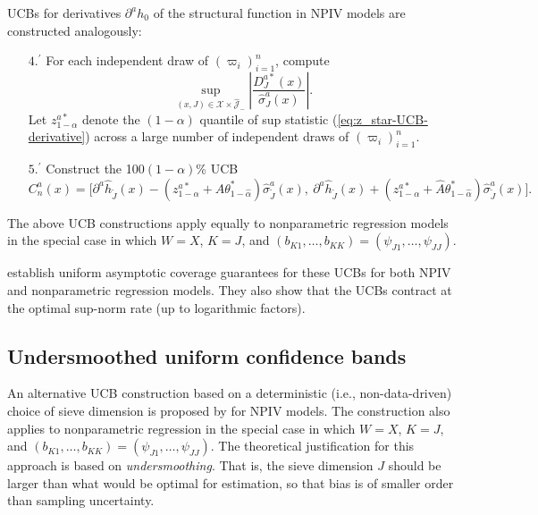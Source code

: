 \documentclass[
]{jss}
\begin{document}
UCBs for derivatives \(\partial^a h_0\) of the structural function in
NPIV models are constructed analogously:

\begin{enumerate}
\item[$4.^{\prime}$] For each independent draw of $(\varpi_i)_{i=1}^n$, compute
\begin{equation} \label{eq:z_star-UCB-derivative}
 \sup_{(x,J) \in \mathcal{X} \times \hat{\mathcal J}_{-}} \left| \frac{D_J^{a*}(x)}{\hat \sigma_J^a(x)} \right|.
\end{equation}
Let $z_{1-\alpha}^{a*}$ denote the $(1-\alpha )$ quantile of sup statistic (\ref{eq:z_star-UCB-derivative}) across a large number of independent draws of $(\varpi_i)_{i=1}^n$.
\item[$5.^{\prime}$] Construct the 100$(1-\alpha)$\% UCB
\begin{equation} \label{band-derivative}
 C_n^a(x) = \bigg[ \partial^a \hat{h}_{\tilde{J}}(x) - \left(\! z_{1-\alpha}^{a*} + \hat A \theta^*_{1-\hat \alpha} \! \right) \hat \sigma_{\tilde J}^a(x) ,~ \partial^a \hat{h}_{\tilde{J}}(x) + \left( \!z_{1-\alpha}^{a*} + \hat A \theta^*_{1-\hat \alpha} \! \right ) \hat \sigma_{\tilde J}^a(x) \bigg] .
\end{equation}
\end{enumerate}

The above UCB constructions apply equally to nonparametric regression
models in the special case in which \(W = X\), \(K = J\), and
\((b_{K1},\ldots,b_{KK}) = (\psi_{J1},\ldots,\psi_{JJ})\).

\citet{CCK} establish uniform asymptotic coverage guarantees for these
UCBs for both NPIV and nonparametric regression models. They also show
that the UCBs contract at the optimal sup-norm rate (up to logarithmic
factors).

\hypertarget{undersmoothed-uniform-confidence-bands}{%
\subsection{Undersmoothed uniform confidence
bands}\label{undersmoothed-uniform-confidence-bands}}

An alternative UCB construction based on a deterministic (i.e.,
non-data-driven) choice of sieve dimension is proposed by \citet{CCQE}
for NPIV models. The construction also applies to nonparametric
regression in the special case in which \(W = X\), \(K = J\), and
\((b_{K1},\ldots,b_{KK}) = (\psi_{J1},\ldots,\psi_{JJ})\). The
theoretical justification for this approach is based on
\emph{undersmoothing}. That is, the sieve dimension \(J\) should be
larger than what would be optimal for estimation, so that bias is of
smaller order than sampling uncertainty.
\end{document}
